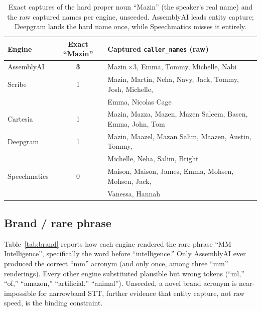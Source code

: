 \documentclass[11pt]{article}
\begin{document}
\begin{table}[ht]
\centering
\small
\begin{tabular}{@{}lcl@{}}
\toprule
\textbf{Engine} & \textbf{Exact ``Mazin''} & \textbf{Captured \texttt{caller\_names} (raw)} \\
\midrule
AssemblyAI & \textbf{3} & Mazin\,$\times$3, Emma, Tommy, Michelle, Nabi \\
Scribe & 1 & Mazin, Martin, Neha, Navy, Jack, Tommy, Josh, Michelle, \\
             & & Emma, Nicolas Cage \\
Cartesia & 1 & Mazin, Mazza, Mazen, Mazen Saleem, Basen, Emma, John, Tom \\
Deepgram & 1 & Mazin, Maazel, Mazan Salim, Maazen, Austin, Tommy, \\
             & & Michelle, Neha, Salim, Bright \\
Speechmatics & 0 & Maison, Maison, James, Emma, Mohsen, Mohsen, Jack, \\
             & & Vanessa, Hannah \\
\bottomrule
\end{tabular}
\caption{Exact captures of the hard proper noun ``Mazin'' (the speaker's real
name) and the raw captured names per engine, unseeded. AssemblyAI leads
entity capture; Deepgram lands the hard name once, while Speechmatics misses it
entirely.}
\label{tab:names}
\end{table}

\subsection{Brand / rare phrase}
\label{sec:brand}

Table~\ref{tab:brand} reports how each engine rendered the rare phrase ``MM
Intelligence'', specifically the word before ``intelligence.'' Only AssemblyAI
ever produced the correct ``mm'' acronym (and only once, among three ``mm''
renderings). Every other engine substituted plausible but wrong tokens
(``ml,'' ``of,'' ``amazon,'' ``artificial,'' ``animal''). Unseeded, a novel
brand acronym is near-impossible for narrowband STT, further evidence that
entity capture, not raw speed, is the binding constraint.
\end{document}

